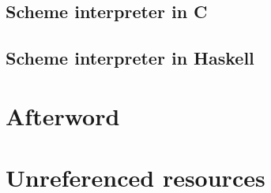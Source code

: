 \documentclass[11pt]{article}
\begin{document}
\subsection{Scheme interpreter in C}

\subsection{Scheme interpreter in Haskell}

%
%
%
%
%
%

\newpage
\section*{Afterword}

\newpage
\section*{Unreferenced resources}


\newpage
\printbibliography[heading=bibintoc, title={References}]
\end{document}
